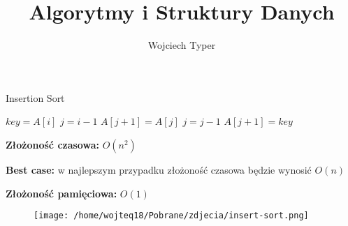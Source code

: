 \documentclass{article}
\title{Algorytmy i Struktury Danych}
\author{Wojciech Typer}
\date{}
\begin{document}
\maketitle

\begin{algorithm}[H]
\caption{Insertion Sort}\label{alg:insertion_sort}
\begin{algorithmic}[1]
        \State $key = A[i]$
        \State $j = i - 1$
            \State $A[j+1] = A[j]$
            \State $j = j - 1$
        \EndWhile
        \State $A[j+1] = key$
    \EndFor
\EndProcedure
\end{algorithmic}
\end{algorithm} 
\vspace{1\baselineskip}
\textbf{Złożoność czasowa:} $O(n^2)$ \par
\textbf{Best case:} w najlepszym przypadku złożoność czasowa będzie wynosić $O(n)$ \par
\textbf{Złożoność pamięciowa:} $O(1)$
\vspace{2\baselineskip}
\begin{figure}[H]
    \centering
    \texttt{[image: /home/wojteq18/Pobrane/zdjecia/insert-sort.png]}
    \label{fig:example_image}
\end{figure}
\vspace{3\baselineskip}
\end{document}
